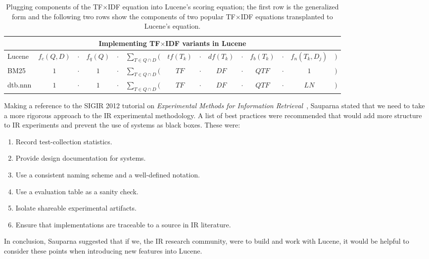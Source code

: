 \begin{table}[bht!]
  \centering
  \small
  \begin{minipage}[t]{0.94\textwidth}

    \begin{tabular}{lccccccccccccc}
      \multicolumn{14}{c}{Implementing TF$\times$IDF variants in Lucene}
      \\
      \hline\hline

      Lucene    & $f_{c}(Q,D)$ & $\cdot$  & $f_{q}(Q)$
      & $\cdot$ & $\displaystyle\sum_{T \in Q \cap D}($  & $tf(T_{k})$
      & $\cdot$ & $df(T_{k})$  & $\cdot$  & $f_{b}(T_{k})$
      & $\cdot$ & $f_{n}(T_{k}, D_{j})$   & $)$ \\
      
      BM25      & $1$          &  $\cdot$ & $1$
      & $\cdot$ & $\displaystyle\sum_{T \in Q \cap D}($  & $TF$
      & $\cdot$ & $DF$          & $\cdot$  & $QTF$
      & $\cdot$ & $1$          & $)$ \\

      dtb.nnn   & $1$          & $\cdot$  & $1$
      & $\cdot$ & $\displaystyle\sum_{T \in Q \cap D}($  & $TF$
      & $\cdot$ & $DF$          & $\cdot$  & $QTF$
      & $\cdot$ & $LN$          & $)$ \\

      \hline\hline
    \end{tabular}

    \caption{\small Plugging components of the TF$\times$IDF equation
      into Lucene's scoring equation; the first row is the generalized
      form and the following two rows show the components of two
      popular TF$\times$IDF equations transplanted to Lucene's
      equation.}

    \label{tab:lucene}
  \end{minipage}
\end{table}

Making a reference to the SIGIR 2012 tutorial on \emph{Experimental
  Methods for Information
  Retrieval}~\cite{Metzler:2012:EMI:2348283.2348534}, Sauparna stated
that we need to take a more rigorous approach to the IR experimental
methodology. A list of best practices were recommended that would add
more structure to IR experiments and prevent the use of systems as
black boxes. These were:

\begin{enumerate}
\item Record test-collection statistics.
\item Provide design documentation for systems.
\item Use a consistent naming scheme and a well-defined notation.
\item Use a evaluation table as a sanity check.
\item Isolate shareable experimental artifacts.
\item Ensure that implementations are traceable to a source in IR
  literature.
\end{enumerate}

In conclusion, Sauparna suggested that if we, the IR research
community, were to build and work with Lucene, it would be helpful to
consider these points when introducing new features into Lucene.


